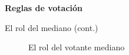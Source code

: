 \documentclass[
  ignorenonframetext,
]{beamer}
\begin{document}
\begin{frame}{\textbf{Reglas de votación}}
\begin{block}{El rol del mediano (cont.)}
\begin{figure}
{}

\caption{El rol del votante mediano}

\end{figure}
\end{block}
\end{frame}
\end{document}
